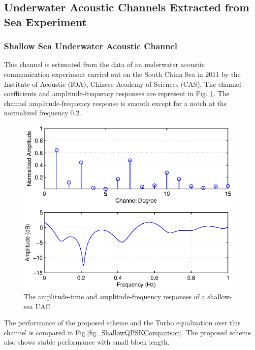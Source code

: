 \documentclass[conference]{IEEEtran}
\begin{document}
\subsection{Underwater Acoustic Channels Extracted from Sea Experiment}

\subsubsection{Shallow Sea Underwater Acoustic Channel}
This channel is estimated from the data of an underwater acoustic communication experiment carried out on the South China Sea in 2011 by the Institute of Acoustic (IOA), Chinese Academy of Sciences (CAS). The channel coefficients and  amplitude-frequency responses are represent in Fig. \ref{fig_ShallowChannel}. The channel amplitude-frequency response is smooth except for a notch at the normalized frequency 0.2. 
\begin{figure}[ht]
\centering
\includegraphics[width=\columnwidth]{ShallowChannel.eps}
\caption{The amplitude-time and amplitude-frequency responses of a shallow-sea UAC}
\label{fig_ShallowChannel}
\end{figure}
The performance of the proposed scheme and the Turbo equalization over this channel is compared in Fig.\ref{fig_ShallowQPSKComparison}. The proposed scheme also shows stable performance with small block length.
\end{document}

